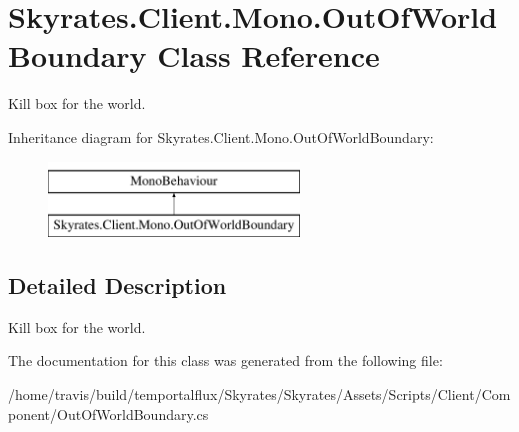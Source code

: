 \hypertarget{class_skyrates_1_1_client_1_1_mono_1_1_out_of_world_boundary}{\section{Skyrates.\-Client.\-Mono.\-Out\-Of\-World\-Boundary Class Reference}
\label{class_skyrates_1_1_client_1_1_mono_1_1_out_of_world_boundary}
}


Kill box for the world.  


Inheritance diagram for Skyrates.\-Client.\-Mono.\-Out\-Of\-World\-Boundary\-:\begin{figure}[H]
\begin{center}
\leavevmode
\includegraphics[height=2.000000cm]{class_skyrates_1_1_client_1_1_mono_1_1_out_of_world_boundary}
\end{center}
\end{figure}


\subsection{Detailed Description}
Kill box for the world. 



The documentation for this class was generated from the following file\-:\begin{DoxyCompactItemize}
\item 
/home/travis/build/temportalflux/\-Skyrates/\-Skyrates/\-Assets/\-Scripts/\-Client/\-Component/Out\-Of\-World\-Boundary.\-cs\end{DoxyCompactItemize}
